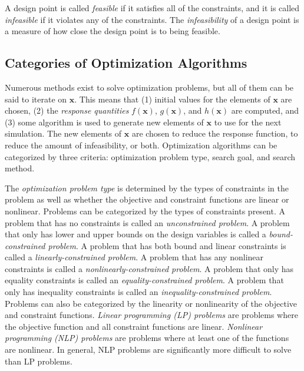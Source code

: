 A design point is called \textit{feasible} if it satisfies all of the constraints, and it is called \textit{infeasible} if it violates any of the constraints.
The \textit{infeasibility} of a design point is a measure of how close the design point is to being feasible.

\subsection{Categories of Optimization Algorithms}
\label{sec:bg:opt:algs}

Numerous methods exist to solve optimization problems, but all of them can be said to iterate on $\textbf{x}$.
This means that (1) initial values for the elements of $\textbf{x}$ are chosen, (2) the \textit{response quantities} $f\left(\textbf{x}\right)$, $g\left(\textbf{x}\right)$, and $h\left(\textbf{x}\right)$ are computed, and (3) some algorithm is used to generate new elements of $\textbf{x}$ to use for the next simulation.
The new elements of $\textbf{x}$ are chosen to reduce the response function, to reduce the amount of infeasibility, or both.
Optimization algorithms can be categorized by three criteria: optimization problem type, search goal, and search method.

The \textit{optimization problem type} is determined by the types of constraints in the problem as well as whether the objective and constraint functions are linear or nonlinear.
Problems can be categorized by the types of constraints present.
A problem that has no constraints is called an \textit{unconstrained problem}.
A problem that only has lower and upper bounds on the design variables is called a \textit{bound-constrained problem}.
A problem that has both bound and linear constraints is called a \textit{linearly-constrained problem}.
A problem that has any nonlinear constraints is called a \textit{nonlinearly-constrained problem}.
A problem that only has equality constraints is called an \textit{equality-constrained problem}.
A problem that only has inequality constraints is called an \textit{inequality-constrained problem}.
Problems can also be categorized by the linearity or nonlinearity of the objective and constraint functions.
\textit{Linear programming (LP) problems} are problems where the objective function and all constraint functions are linear.
\textit{Nonlinear programming (NLP) problems} are problems where at least one of the functions are nonlinear.
In general, NLP problems are significantly more difficult to solve than LP problems.

